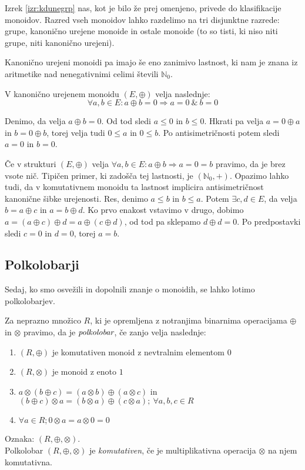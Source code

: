 \documentclass[mat1]{fmfdelo}
\newcommand{\N}{\mathbb{N}}
\newcommand{\No}{\N_0}
\newcommand{\pojem}[1]{\ensuremath{\emph{#1}}}
\begin{document}
\begin{opomba}
	Izrek \ref{izr:kdunegrp} nas, kot je bilo že prej omenjeno, privede do klasifikacije monoidov. Razred vseh monoidov lahko razdelimo na tri disjunktne razrede: grupe, kanonično urejene monoide in ostale monoide (to so tisti, ki niso niti grupe, niti kanonično urejeni).
\end{opomba}

Kanonično urejeni monoidi pa imajo še eno zanimivo lastnost, ki nam je znana iz aritmetike nad nenegativnimi celimi števili $\No$.

\begin{trditev}
	V kanonično urejenem monoidu $(E, \oplus)$ velja naslednje: $$\forall a, b \in E: a\oplus b = 0 \Rightarrow a = 0 ~\& ~ b = 0$$
\end{trditev}
\begin{dokaz}
	Denimo, da velja $a \oplus b = 0$. Od tod sledi $a\leq 0$ in $b \leq 0$. Hkrati pa velja $a = 0 \oplus a$ in $b = 0 \oplus b$, torej velja tudi $0 \leq a$ in $0 \leq b$. Po antisimetričnosti potem sledi $a = 0$ in $b = 0$.
\end{dokaz}

\begin{opomba}
	\label{opomb:vsotnic}
	Če v strukturi $(E, \oplus)$ velja $\forall a, b \in E: a\oplus b \Rightarrow a = 0 = b$ pravimo, da je brez vsote nič. Tipičen primer, ki zadošča tej lastnosti, je $(\No, +)$. Opazimo lahko tudi, da v komutativnem monoidu ta lastnost implicira antisimetričnost kanonične šibke urejenosti. Res, denimo $a\leq b$ in $b\leq a$. Potem $\exists c, d\in E$, da velja $b = a \oplus c$ in $a = b \oplus d$. Ko prvo enakost vstavimo v drugo, dobimo $a = (a \oplus c) \oplus d = a \oplus (c\oplus d)$, od tod pa sklepamo $d\oplus d = 0$. Po predpostavki sledi $c = 0$ in $d = 0$, torej $a = b$.
\end{opomba}

\subsection{Polkolobarji}
Sedaj, ko smo osvežili in dopolnili znanje o monoidih, se lahko lotimo polkolobarjev.
\begin{definicija}
	Za neprazno množico $R$, ki je opremljena z notranjima binarnima operacijama $\oplus$ in $\otimes$ pravimo, da je \pojem{polkolobar}, če zanjo velja naslednje:
	\begin{enumerate}
		\item $(R, \oplus)$ je komutativen monoid z nevtralnim elementom $0$
		\item $(R, \otimes)$ je monoid z enoto $1$
		\item $a\otimes(b \oplus c) = (a\otimes b) \oplus (a\otimes c)$ in $(b \oplus c)\otimes a = (b\otimes a) \oplus (c\otimes a);~\forall a, b, c\in R$
		\item  \label{def:izniči} $\forall a\in R; 0 \otimes a = a\otimes 0 = 0$
	\end{enumerate}
	Oznaka: $(R, \oplus, \otimes)$. \\ Polkolobar $(R, \oplus, \otimes)$ je \textit{komutativen}, če je multiplikativna operacija $\otimes$ na njem komutativna.
\end{definicija}
\end{document}
